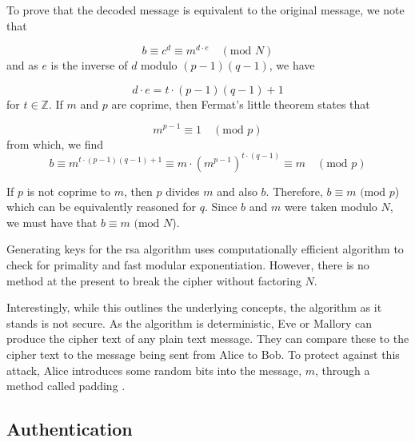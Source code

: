 To prove that the decoded message is equivalent to the original message, we note that

\begin{equation}
	b \equiv c^d \equiv m ^{d\cdot e}\quad(\text{mod } N)
\end{equation} 
and as $e$ is the inverse of $d$ modulo $(p - 1)(q - 1)$, we have

\begin{equation}
	d \cdot e = t \cdot (p - 1)(q - 1) + 1
\end{equation}
for $t\in\mathbb{Z}$. If $m$ and $p$ are coprime, then Fermat's little theorem states that 

\begin{equation}
	m^{p-1} \equiv 1\quad(\text{mod }p)
\end{equation}
from which, we find
\begin{equation}
	b \equiv m^{t \cdot (p - 1)(q - 1) + 1} \equiv m \cdot (m^{p-1})^{t\cdot(q-1)} \equiv m \quad(\text{mod } p)
\end{equation}

If $p$ is not coprime to $m$, then $p$ divides $m$ and also $b$. Therefore, $b\equiv m \text{ (mod } p$) which can be equivalently reasoned for $q$. Since $b$ and $m$ were taken modulo $N$, we must have that $b\equiv m \text{ (mod } N$).

Generating keys for the \ac{rsa} algorithm uses computationally efficient algorithm to check for primality and fast modular exponentiation. However, there is no method at the present to break the cipher without factoring $N$. 

Interestingly, while this outlines the underlying concepts, the algorithm as it stands is not secure. As the algorithm is deterministic, Eve or Mallory can produce the cipher text of any plain text message. They can compare these to the cipher text to the message being sent from Alice to Bob. To protect against this attack, Alice introduces some random bits into the message, $m$, through a method called padding \cite{goldwasser1982probabilistic}. 



\subsection{Authentication}

